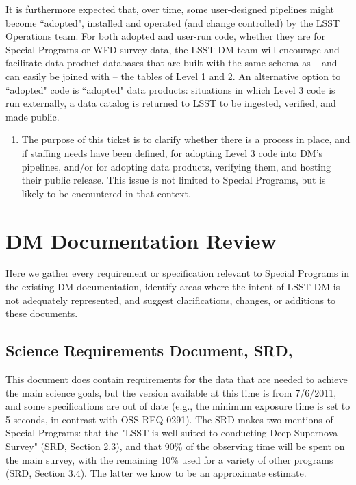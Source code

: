 \documentclass[DM,lsstdraft,toc]{lsstdoc}
\begin{document}
It is furthermore expected that, over time, some user-designed pipelines might become ``adopted", installed and operated (and change controlled) by the LSST Operations team. For both adopted and user-run code, whether they are for Special Programs or WFD survey data, the LSST DM team will encourage and facilitate data product databases that are built with the same schema as -- and can easily be joined with -- the tables of Level 1 and 2. An alternative option to ``adopted" code is ``adopted" data products: situations in which Level 3 code is run externally, a data catalog is returned to LSST to be ingested, verified, and made public.

\begin{enumerate}[resume,topsep=-10pt,after=\vspace{10pt},label= \textbf{Action \Roman*}] \item \label{L3-2} The purpose of this ticket is to clarify whether there is a process in place, and if staffing needs have been defined, for adopting Level 3 code into DM's pipelines, and/or for adopting data products, verifying them, and hosting their public release. This issue is not limited to Special Programs, but is likely to be encountered in that context. \end{enumerate}



\clearpage
\section{DM Documentation Review}\label{sec:docrev}

Here we gather every requirement or specification relevant to Special Programs in the existing DM documentation, identify areas where the intent of LSST DM is not adequately represented, and suggest clarifications, changes, or additions to these documents.

\subsection{Science Requirements Document, SRD, }\label{ssec:docrev_srd}

This document does contain requirements for the data that are needed to achieve the main science goals, but the version available at this time is from 7/6/2011, and some specifications are out of date (e.g., the minimum exposure time is set to 5 seconds, in contrast with OSS-REQ-0291). The SRD makes two mentions of Special Programs: that the "LSST is well suited to conducting Deep Supernova Survey" (SRD, Section 2.3), and that 90\% of the observing time will be spent on the main survey, with the remaining 10\% used for a variety of other programs (SRD, Section 3.4). The latter we know to be an approximate estimate.
\end{document}
